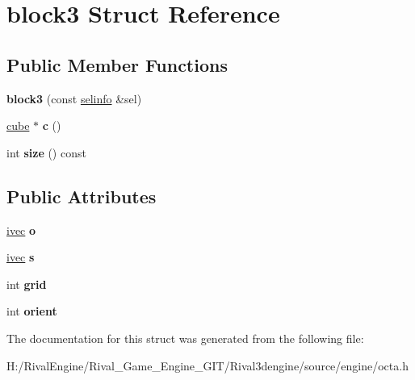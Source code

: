 \hypertarget{structblock3}{}\section{block3 Struct Reference}
\label{structblock3}
\subsection*{Public Member Functions}
\begin{DoxyCompactItemize}
\item 
\mbox{\label{structblock3_a6a8f0d4d661fee239ff5be5c63c30fc3}} 
{\bfseries block3} (const \hyperlink{structselinfo}{selinfo} \&sel)
\item 
\mbox{\label{structblock3_adf0824981bc64c9e38d0992216907b3f}} 
\hyperlink{structcube}{cube} $\ast$ {\bfseries c} ()
\item 
\mbox{\label{structblock3_ab61c08cdf7ad396f4241f299c8e1b45b}} 
int {\bfseries size} () const
\end{DoxyCompactItemize}
\subsection*{Public Attributes}
\begin{DoxyCompactItemize}
\item 
\mbox{\label{structblock3_a0791a74c1bed41349ab86e7b2dea2788}} 
\hyperlink{structivec}{ivec} {\bfseries o}
\item 
\mbox{\label{structblock3_a6c3aa35448d7552c040881c1bd0e4aa6}} 
\hyperlink{structivec}{ivec} {\bfseries s}
\item 
\mbox{\label{structblock3_ad8e892ec4498e1738d6a5c074b3b0d0b}} 
int {\bfseries grid}
\item 
\mbox{\label{structblock3_a702dec30718798d2ec8c9070d37dcb44}} 
int {\bfseries orient}
\end{DoxyCompactItemize}


The documentation for this struct was generated from the following file\+:\begin{DoxyCompactItemize}
\item 
H\+:/\+Rival\+Engine/\+Rival\+\_\+\+Game\+\_\+\+Engine\+\_\+\+G\+I\+T/\+Rival3dengine/source/engine/octa.\+h\end{DoxyCompactItemize}
